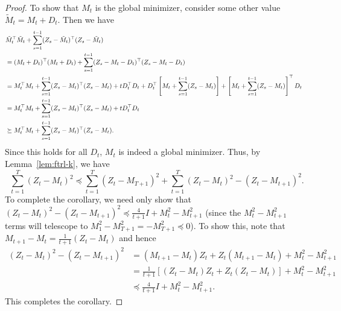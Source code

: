 \documentclass[11pt]{article}
\begin{document}
\begin{proof}
To show that $M_t$ is the global minimizer, consider some other value $\tilde{M}_t = M_t + D_t$. Then we have 
\begin{align}
\lefteqn{\tilde{M}_t^{\top}\tilde{M}_t + \sum_{s=1}^{t-1} (Z_s - \tilde{M}_t)^{\top}(Z_s - \tilde{M}_t)} \\
 &= (M_t + D_t)^{\top}(M_t + D_t) + \sum_{s=1}^{t-1} (Z_s - M_t - D_t)^{\top}(Z_s - M_t - D_t) \\
 &= M_t^{\top}M_t + \sum_{s=1}^{t-1} (Z_s - M_t)^{\top}(Z_s - M_t) + tD_t^{\top}D_t + D_t^{\top}\left[ M_t + \sum_{s=1}^{t-1} (Z_s - M_t) \right] + \left[ M_t + \sum_{s=1}^{t-1} (Z_s - M_t)\right]^{\top} D_t \\
 &= M_t^{\top}M_t + \sum_{s=1}^{t-1} (Z_s - M_t)^{\top}(Z_s - M_t) + tD_t^{\top}D_t \\
 &\succeq M_t^{\top}M_t + \sum_{s=1}^{t-1} (Z_s - M_t)^{\top}(Z_s - M_t).
\end{align}
Since this holds for all $D_t$, $M_t$ is indeed a global minimizer. Thus, by Lemma~\ref{lem:ftrl-k}, we have
\[ \sum_{t=1}^T (Z_t - M_t)^2 \preceq \sum_{t=1}^T (Z_t - M_{T+1})^2 + \sum_{t=1}^T (Z_t-M_t)^2 - (Z_t-M_{t+1})^2. \]
To complete the corollary, we need only show that $(Z_t-M_t)^2 - (Z_t-M_{t+1})^2 \preceq \frac{4}{t+1}I + M_t^2 - M_{t+1}^2$ 
(since the $M_t^2 - M_{t+1}^2$ terms will telescope to $M_1^2 - M_{T+1}^2 = -M_{T+1}^2 \preceq 0$).
To show this, note that $M_{t+1} - M_t = \frac{1}{t+1}(Z_t - M_t)$ and hence
\begin{align}
(Z_t - M_t)^2 - (Z_t - M_{t+1})^2 &= (M_{t+1}-M_t)Z_t + Z_t(M_{t+1}-M_t) + M_t^2 - M_{t+1}^2 \\
  &= \frac{1}{t+1}\left[(Z_t - M_t)Z_t + Z_t(Z_t-M_t)\right] + M_t^2 - M_{t+1}^2 \\
  &\preceq \frac{4}{t+1}I + M_t^2 - M_{t+1}^2.
\end{align}
This completes the corollary.
\end{proof}

% 
\end{document}
